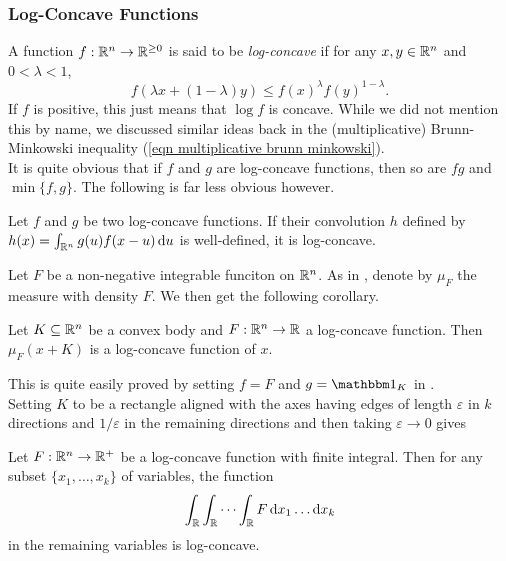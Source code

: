 \subsubsection{Log-Concave Functions}

A function $f:\mathbb{R}^n\to\mathbb{R}^{\geq 0}$ is said to be \textit{log-concave} if for any $x,y\in\mathbb{R}^n$ and $0<\lambda<1$,
\[ f(\lambda x + (1-\lambda)y) \leq f(x)^\lambda f(y)^{1-\lambda}. \]
If $f$ is positive, this just means that $\log f$ is concave. While we did not mention this by name, we discussed similar ideas back in the (multiplicative) Brunn-Minkowski inequality (\ref{eqn multiplicative brunn minkowski}).\\

It is quite obvious that if $f$ and $g$ are log-concave functions, then so are $fg$ and $\min\{f,g\}$. The following is far less obvious however.

\begin{lemma}
\label{convolution of log concave functions is log concave}
	Let $f$ and $g$ be two log-concave functions. If their convolution $h$ defined by $h(x)=\int_{\mathbb{R}^n}g(u)f(x-u)\operatorname{d}\!{u}$ is well-defined, it is log-concave.
\end{lemma}

Let $F$ be a non-negative integrable funciton on $\mathbb{R}^n$. As in , denote by $\mu_F$ the measure with density $F$. We then get the following corollary.

\begin{corollary}
\label{F(x+K) log concave K convex}
	Let $K\subseteq\mathbb{R}^n$ be a convex body and $F:\mathbb{R}^n\to\mathbb{R}$ a log-concave function. Then $\mu_F(x+K)$ is a log-concave function of $x$.
\end{corollary}

This is quite easily proved by setting $f=F$ and $g=\indic_K$ in .\\

Setting $K$ to be a rectangle aligned with the axes having edges of length $\varepsilon$ in $k$ directions and $1/\varepsilon$ in the remaining directions and then taking $\varepsilon\to 0$ gives

\begin{corollary}
	\label{cor: 4.30}
	Let $F:\mathbb{R}^n\to\mathbb{R}^+$ be a log-concave function with finite integral. Then for any subset $\{x_1,\ldots,x_k\}$ of variables, the function
	\[ \int_{\mathbb{R}} \int_{\mathbb{R}} \cdots \int_{\mathbb{R}} F \operatorname{d}\!{x}_1\ldots\operatorname{d}\!{x_k} \]
	in the remaining variables is log-concave.
\end{corollary}


